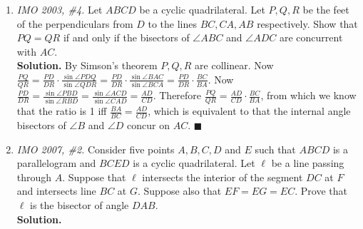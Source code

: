 \documentclass[11pt,a4paper]{article}
\begin{document}
\begin {enumerate}
\item\emph {IMO 2003, \#4.} Let $ABCD$ be a cyclic quadrilateral. Let $P,Q,R$ be the feet of the perpendiculars from $D$ to the lines $BC, CA, AB$ respectively. Show that $PQ=QR$ if and only if the bisectors of $\angle ABC$ and $\angle ADC$ are concurrent with $AC$.\\
\textbf {Solution.} By Simson's theorem $P,Q,R$ are collinear. Now $\frac{PQ}{QR}=\frac{PD}{DR}\cdot\frac{\sin\angle PDQ}{\sin\angle QDR}=\frac{PD}{DR}\cdot\frac{\sin\angle BAC}{\sin\angle BCA}=\frac{PD}{DR}\cdot\frac{BC}{BA}.$ Now $\frac{PD}{DR}=\frac{\sin\angle PBD}{\sin\angle RBD}=\frac{\sin\angle ACD}{\sin\angle CAD}=\frac{AD}{CD}$. Therefore $\frac{PQ}{QR}=\frac{AD}{CD}\cdot\frac{BC}{BA}$, from which we know that the ratio is 1 iff $\frac{BA}{BC}=\frac{AD}{CD}$, which is equivalent to that the internal angle bisectors of $\angle B$ and $\angle D$ concur on $AC$. $\blacksquare$

\item\emph {IMO 2007, \#2.} Consider  five  points $A,B,C,D$ and $E$ such that $ABCD$ is a parallelogram and $BCED$ is a cyclic quadrilateral. Let $\ell$ be a line passing through $A$. Suppose that $\ell$ intersects the interior of the segment $DC$ at $F$ and intersects line $BC$ at $G$. Suppose also that $EF=EG=EC$. Prove that $\ell$ is the bisector of angle $DAB$.\\
\textbf{Solution.} \usetikzlibrary{arrows}



\end{enumerate}
\end{document}

